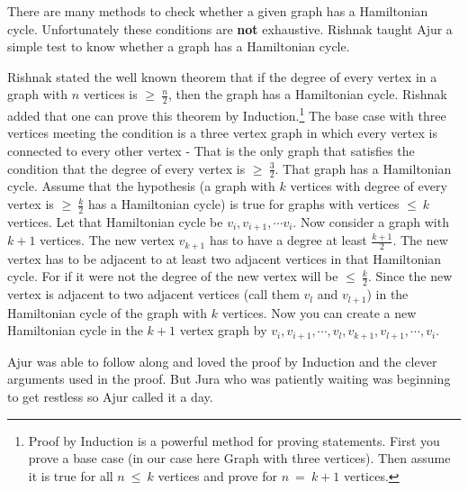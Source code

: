 There are many methods to check whether a given graph has a Hamiltonian cycle. Unfortunately these conditions are \textbf{not} exhaustive. Rishnak taught Ajur a simple test to know whether a graph has a Hamiltonian cycle.

Rishnak stated the well known theorem that if the degree of every vertex in a graph with $n$ vertices is $\ge~\frac{n}{2}$, then the graph has a Hamiltonian cycle. Rishnak added that one can prove this theorem by Induction.\footnote{Proof by Induction is a powerful method for proving  statements.  First you prove a base case (in our case here Graph with three vertices). Then assume it is true for all $n~ \le ~k$ vertices and prove for $n~=~k+1$ vertices.} The base case with three vertices meeting the condition is a three vertex graph in which every vertex is connected to every other vertex - That is the only graph that satisfies the condition that the degree of every vertex is $\ge~\frac{3}{2}$. That graph has a Hamiltonian cycle. Assume that the hypothesis (a graph with $k$ vertices with degree of every vertex is $\ge~\frac{k}{2}$ has a Hamiltonian cycle) is true for graphs with vertices $\le~ k$ vertices. Let that Hamiltonian cycle be $v_i,v_{i+1},\cdots v_i$. Now consider a graph with $k+1$ vertices. The new vertex $v_{k+1}$ has to have a degree at least $\frac{k+1}{2}$.  The new vertex has to be adjacent to at least two adjacent vertices in that Hamiltonian cycle. For if it were not the degree of the new vertex will be $\le~\frac{k}{2}$. Since the new vertex is adjacent to two adjacent vertices (call them $v_l$ and $v_{l+1}$) in the Hamiltonian cycle of the graph with $k$ vertices. Now you can create a new Hamiltonian cycle in the $k+1$ vertex graph by $v_i,v_{i+1},\cdots,v_l,v_{k+1},v_{l+1},\cdots,v_i$. 

Ajur was able to follow along and loved the proof by Induction and the clever arguments used in the proof. But Jura who was patiently waiting was beginning to get restless so Ajur called it a day.
